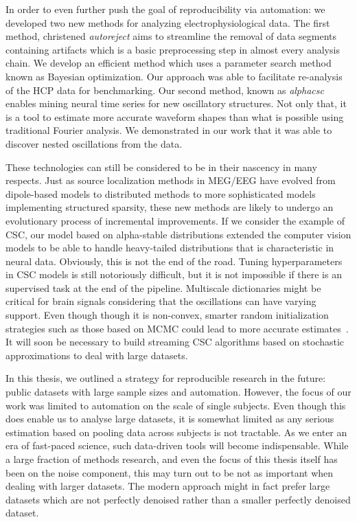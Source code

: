 In order to even further push the goal of reproducibility via automation: we developed two new methods for analyzing electrophysiological data. The first method, christened \emph{autoreject} aims to streamline the removal of data segments containing artifacts which is a basic preprocessing step in almost every analysis chain. We develop an efficient method which uses a parameter search method known as Bayesian optimization. Our approach was able to facilitate re-analysis of the \ac{HCP} data for benchmarking. Our second method, known as \emph{alphacsc} enables mining neural time series for new oscillatory structures. Not only that, it is a tool to estimate more accurate waveform shapes than what is possible using traditional Fourier analysis. We demonstrated in our work that it was able to discover nested oscillations from the data.

These technologies can still be considered to be in their nascency in many respects. Just as source localization methods in \ac{MEG}/\ac{EEG} have evolved from dipole-based models to distributed methods to more sophisticated models implementing structured sparsity, these new methods are likely to undergo an evolutionary process of incremental improvements. If we consider the example of \ac{CSC}, our model based on alpha-stable distributions extended the computer vision models to be able to handle heavy-tailed distributions that is characteristic in neural data. Obviously, this is not the end of the road. Tuning hyperparameters in \ac{CSC} models is still notoriously difficult, but it is not impossible if there is an supervised task at the end of the pipeline. Multiscale dictionaries might be critical for brain signals considering that the oscillations can have varying support. Even though though it is non-convex, smarter random initialization strategies such as those based on \ac{MCMC} could lead to more accurate estimates~\citep{bachem2016fast}. It will soon be necessary to build streaming \ac{CSC} algorithms based on stochastic approximations to deal with large datasets.

In this thesis, we outlined a strategy for reproducible research in the future: public datasets with large sample sizes and automation. However, the focus of our work was limited to automation on the scale of single subjects. Even though this does enable us to analyse large datasets, it is somewhat limited as any serious estimation based on pooling data across subjects is not tractable. As we enter an era of fast-paced science, such data-driven tools will become indispensable. While a large fraction of methods research, and even the focus of this thesis itself has been on the noise component, this may turn out to be not as important when dealing with larger datasets. The modern approach might in fact prefer large datasets which are not perfectly denoised rather than a smaller perfectly denoised dataset. 

